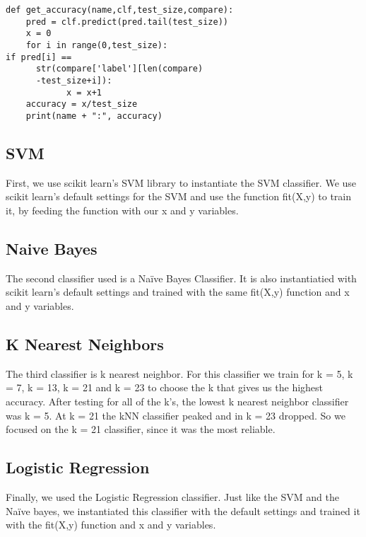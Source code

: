 \documentclass[10pt,journal,compsoc]{IEEEtran}
\begin{document}
\lstset{language=Python}
\lstset{frame=lines}
\begin{lstlisting}
def get_accuracy(name,clf,test_size,compare):
    pred = clf.predict(pred.tail(test_size))
    x = 0
    for i in range(0,test_size):
if pred[i] == 
      str(compare['label'][len(compare)
      -test_size+i]):
            x = x+1
    accuracy = x/test_size
    print(name + ":", accuracy) 

\end{lstlisting}



\subsection{SVM}
First, we use scikit learn’s SVM library to instantiate the SVM classifier. We use scikit learn’s default settings for the SVM and use the function fit(X,y) to train it, by feeding the function with our x and y variables.

\subsection{Naive Bayes}
The second classifier used is a Naïve Bayes Classifier. It is also instantiatied with scikit learn’s default settings and trained with the same fit(X,y) function and x and y variables. 

\subsection{K Nearest Neighbors}
The third classifier is k nearest neighbor. For this classifier we train for k = 5, k = 7, k = 13, k = 21 and k = 23 to choose the k that gives us the highest accuracy. After testing for all of the k’s, the lowest k nearest neighbor classifier was k = 5. At k = 21 the kNN classifier peaked and in k = 23 dropped. So we focused on the k = 21 classifier, since it was the most reliable.

\subsection{Logistic Regression}
Finally, we used the Logistic Regression classifier. Just like the SVM and the Naïve bayes, we instantiated this classifier with the default settings and trained it with the fit(X,y) function and x and y variables. 
\end{document}
